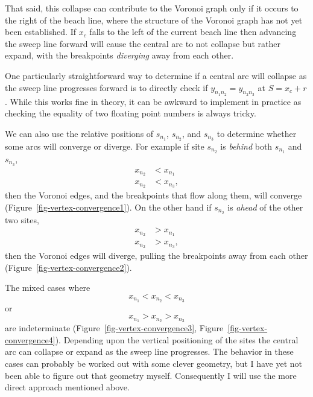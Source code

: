 \documentclass[
  letterpaper,
  DIV=11,
  numbers=noendperiod]{scrartcl}
\begin{document}
That said, this collapse can contribute to the Voronoi graph only if it
occurs to the right of the beach line, where the structure of the
Voronoi graph has not yet been established. If \(x_{c}\) falls to the
left of the current beach line then advancing the sweep line forward
will cause the central arc to not collapse but rather expand, with the
breakpoints \emph{diverging} away from each other.

One particularly straightforward way to determine if a central arc will
collapse as the sweep line progresses forward is to directly check if
\(y_{ n_{1} n_{2} } = y_{ n_{2} n_{3} }\) at \(S = x_{c} + r\). While
this works fine in theory, it can be awkward to implement in practice as
checking the equality of two floating point numbers is always tricky.

We can also use the relative positions of \(s_{n_{1}}\), \(s_{n_{2}}\),
and \(s_{n_{3}}\) to determine whether some arcs will converge or
diverge. For example if site \(s_{n_{2}}\) is \emph{behind} both
\(s_{n_{1}}\) and \(s_{n_{3}}\), \begin{align*}
x_{n_{2}} &< x_{n_{1}}
\\
x_{n_{2}} &< x_{n_{3}},
\end{align*} then the Voronoi edges, and the breakpoints that flow along
them, will converge (Figure~\ref{fig-vertex-convergence1}). On the other
hand if \(s_{n_{2}}\) is \emph{ahead} of the other two sites,
\begin{align*}
x_{n_{2}} &> x_{n_{1}}
\\
x_{n_{2}} &> x_{n_{3}},
\end{align*} then the Voronoi edges will diverge, pulling the
breakpoints away from each other (Figure~\ref{fig-vertex-convergence2}).

The mixed cases where \[
x_{n_{1}} < x_{n_{2}} < x_{n_{3}}
\] or \[
x_{n_{1}} > x_{n_{2}} > x_{n_{3}}
\] are indeterminate (Figure~\ref{fig-vertex-convergence3},
Figure~\ref{fig-vertex-convergence4}). Depending upon the vertical
positioning of the sites the central arc can collapse or expand as the
sweep line progresses. The behavior in these cases can probably be
worked out with some clever geometry, but I have yet not been able to
figure out that geometry myself. Consequently I will use the more direct
approach mentioned above.
\end{document}

